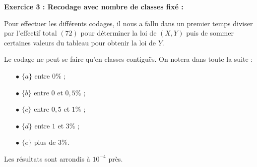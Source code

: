 \documentclass{article}
\begin{document}
\newpage

\textbf{Exercice 3 : Recodage avec nombre de classes fixé :}

Pour effectuer les différents codages, il nous a fallu dans un premier temps diviser par l'effectif total $(72)$ pour déterminer la loi de $(X,Y)$ puis de sommer certaines valeurs du tableau pour obtenir la loi de $Y$.

Le codage ne peut se faire qu'en classes contiguës. On notera dans toute la suite : 
\begin{itemize}
\item[$\bullet$] $\{a\}$ entre $0\%$ ;
\item[$\bullet$] $\{b\}$ entre $0$ et $0,5\%$ ;
\item[$\bullet$] $\{c\}$ entre $0,5$ et $1\%$ ;
\item[$\bullet$] $\{d\}$ entre $1$ et $3\%$ ;
\item[$\bullet$] $\{e\}$ plus de $3\%$.
\end{itemize} 

Les résultats sont arrondis à $10^{-4}$ près.
\end{document}
